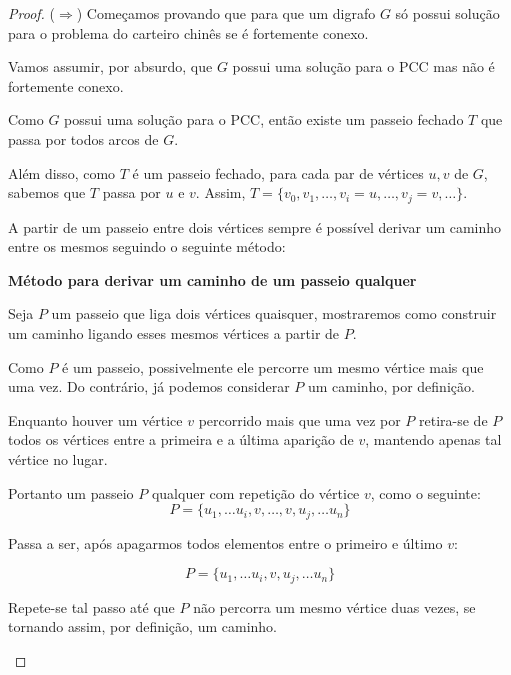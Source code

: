     \begin{proof}


        ($\Rightarrow$) Começamos provando que para que um digrafo $G$ só possui solução para o problema do carteiro chinês se é fortemente conexo.

        Vamos assumir, por absurdo, que $G$ possui uma solução para o PCC mas não é fortemente conexo.

        Como $G$ possui uma solução para o PCC, então existe um passeio fechado $T$ que passa por todos arcos de $G$.

         Além disso, como $T$ é um passeio fechado, para cada par de vértices $u, v$ de $G$, sabemos que $T$ passa por $u$ e $v$.
         Assim, $T = \{ v_0, v_1, \dots, v_i = u, \dots, v_j = v, \dots \}$.

        A partir de um passeio entre dois vértices sempre é possível derivar um caminho entre os mesmos seguindo o seguinte método:

        \begin{tcolorbox}
            \textbf{Método para derivar um caminho de um passeio qualquer}
            
            Seja $P$ um passeio que liga dois vértices quaisquer, mostraremos como construir um caminho ligando esses mesmos vértices a partir de $P$.

            Como $P$ é um passeio, possivelmente ele percorre um mesmo vértice mais que uma vez. Do contrário, já podemos considerar $P$ um caminho, por definição. 

            Enquanto houver um vértice $v$ percorrido mais que uma vez por $P$ retira-se de $P$ todos os vértices entre a primeira e a última aparição de $v$, mantendo apenas tal vértice no lugar.


            Portanto um passeio $P$ qualquer com repetição do vértice $v$, como o seguinte:
            \[
                P = \{ u_1, \dots u_i, v, \dots, v, u_j, \dots u_n\}
            \]

            Passa a ser, após apagarmos todos elementos entre o primeiro e último $v$:


            \[
                P = \{ u_1, \dots u_i, v, u_j, \dots u_n\}
            \]

            Repete-se tal passo até que $P$ não percorra um mesmo vértice duas vezes, se tornando assim, por definição, um caminho.

        \end{tcolorbox}
         

\end{proof}
